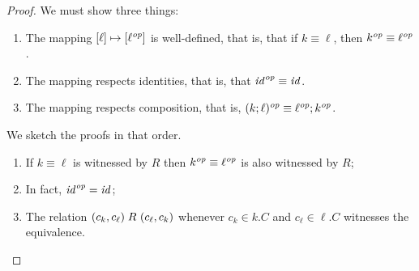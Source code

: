 \begin{defn}[$R$-similarity]
\begin{theorem}
\begin{lemma}
\begin{proof}
We must show three things:
\begin{enumerate}
    \item The mapping $[\ell] \mapsto [\ell^\mathit{op}]$ is
        well-defined, that is, that if $k \equiv \ell$, then $k^\mathit{op} \equiv
        \ell^\mathit{op}$.
    \item The mapping respects identities, that is, that $\mathit{id}^\mathit{op} \equiv
        \mathit{id}$.
    \item The mapping respects composition, that is, $(k;\ell)^\mathit{op} \equiv
        \ell^\mathit{op};k^\mathit{op}$.
\end{enumerate}
We sketch the proofs in that order. 
\begin{enumerate}
    \item If $k \equiv \ell$ is witnessed by $R$ then $k^\mathit{op} \equiv
        \ell^\mathit{op}$ is also witnessed by $R$; 
    \item In fact, $\mathit{id}^\mathit{op} = \mathit{id}$; %
    \item The relation $(c_k,c_\ell) \mathrel{R_{}} (c_\ell,c_k)$ whenever $c_k \in
        k.C$ and $c_\ell \in \ell.C$ witnesses the equivalence. 



\end{enumerate}
\end{proof}


\end{lemma}
\end{theorem}
\end{defn}
